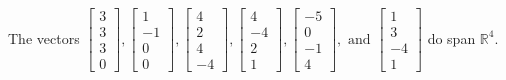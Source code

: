 \begin{exercise}
\begin{exerciseStatement}
  \end{exerciseStatement}
  \begin{exerciseAnswer}
   The vectors \(\left[\begin{array}{r}
3 \\
3 \\
3 \\
0
\end{array}\right] , \left[\begin{array}{r}
1 \\
-1 \\
0 \\
0
\end{array}\right] , \left[\begin{array}{r}
4 \\
2 \\
4 \\
-4
\end{array}\right] , \left[\begin{array}{r}
4 \\
-4 \\
2 \\
1
\end{array}\right] , \left[\begin{array}{r}
-5 \\
0 \\
-1 \\
4
\end{array}\right] , \text{ and } \left[\begin{array}{r}
1 \\
3 \\
-4 \\
1
\end{array}\right]\) 
  	 do  
	span \(\mathbb{R}^4\).
  


  \end{exerciseAnswer}
\end{exercise}